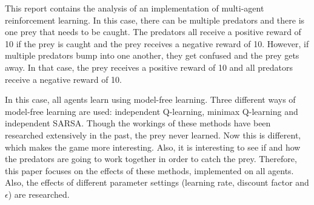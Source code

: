 This report contains the analysis of an implementation of multi-agent reinforcement learning. In this case, there can be multiple predators and there is one prey that needs to be caught. The predators all receive a positive reward of 10 if the prey is caught and the prey receives a negative reward of 10. However, if multiple predators bump into one another, they get confused and the prey gets away. In that case, the prey receives a positive reward of 10 and all predators receive a negative reward of 10. 

In this case, all agents learn using model-free learning. Three different ways of model-free learning are used: independent Q-learning, minimax Q-learning and independent SARSA. Though the workings of these methods have been researched extensively in the past, the prey never learned. Now this is different, which makes the game more interesting. Also, it is interesting to see if and how the predators are going to work together in order to catch the prey. Therefore, this paper focuses on the effects of these methods, implemented on all agents. Also, the effects of different parameter settings (learning rate, discount factor and $\epsilon$) are researched.